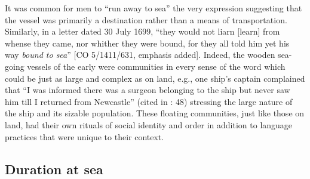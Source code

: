 It was common for men to “run away to sea” \citep[67,]{Jarvis2010} the very expression suggesting that the vessel was primarily a destination rather than a means of transportation. Similarly, in a letter dated 30 July {1699}, “they would not liarn [learn] from whense they came, nor whither they were bound, for they all told him yet his way \textit{bound to sea}” [CO 5/1411/631, emphasis added]. Indeed, the wooden sea-going vessels of the early  were communities in every sense of the word which could be just as large and complex as on land, e.g., one ship’s captain complained that “I was informed there was a surgeon belonging to the ship but never saw him till I returned from Newcastle” (cited in \citealt{Brown2011}: 48) stressing the large nature of the ship and its sizable population. These floating communities, just like those on land, had their own rituals of social identity and order in addition to language practices that were unique to their context.

\subsection{{Duration at sea}}\label{sec:4.2.1}

